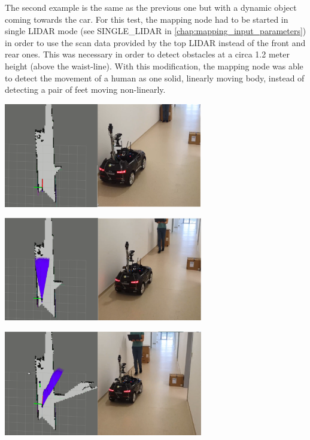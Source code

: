 The second example is the same as the previous one but with a dynamic object coming towards the car. For this test, the mapping node had to be started in single LIDAR mode (see SINGLE\_LIDAR in \ref{chap:mapping_input_parameters}) in order to use the scan data provided by the top LIDAR instead of the front and rear ones. This was necessary in order to detect obstacles at a circa 1.2 meter height (above the waist-line). With this modification, the mapping node was able to detect the movement of a human as one solid, linearly moving body, instead of detecting a pair of feet moving non-linearly. 

\begin{center}
	\includegraphics[width=0.65\textwidth]{figures/raw/local_planner_real_test_joined_straight_traj_1_dynamic_obj_1.png}
	
	\vspace{0.5cm}
	\includegraphics[width=0.65\textwidth]{figures/raw/local_planner_real_test_joined_straight_traj_1_dynamic_obj_2.png}
	
	\vspace{0.5cm}
	\includegraphics[width=0.65\textwidth]{figures/raw/local_planner_real_test_joined_straight_traj_1_dynamic_obj_3.png}
	

\end{center}
